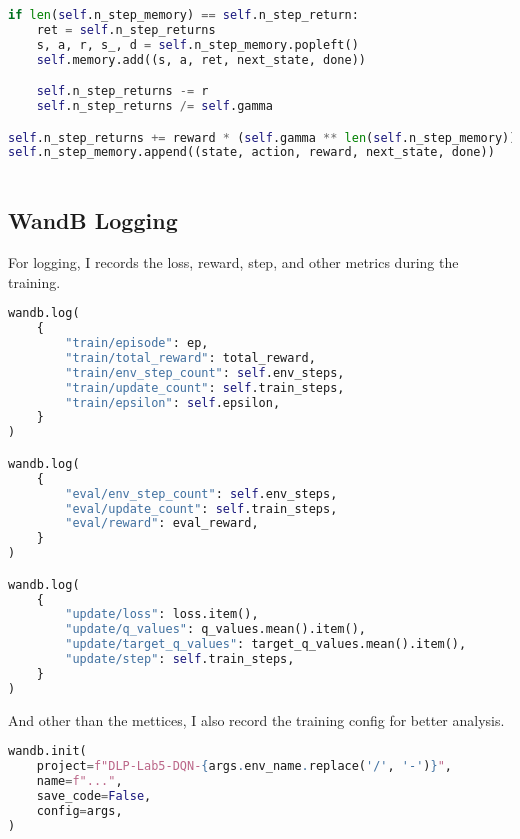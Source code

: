 \begin{lstlisting}[language=Python]
if len(self.n_step_memory) == self.n_step_return:
    ret = self.n_step_returns
    s, a, r, s_, d = self.n_step_memory.popleft()
    self.memory.add((s, a, ret, next_state, done))

    self.n_step_returns -= r
    self.n_step_returns /= self.gamma

self.n_step_returns += reward * (self.gamma ** len(self.n_step_memory))
self.n_step_memory.append((state, action, reward, next_state, done))



\end{lstlisting}

\subsection{WandB Logging}
For logging, I records the loss, reward, step, and other metrics during the training.

\begin{lstlisting}[language=Python]
wandb.log(
    {
        "train/episode": ep,
        "train/total_reward": total_reward,
        "train/env_step_count": self.env_steps,
        "train/update_count": self.train_steps,
        "train/epsilon": self.epsilon,
    }
)

wandb.log(
    {
        "eval/env_step_count": self.env_steps,
        "eval/update_count": self.train_steps,
        "eval/reward": eval_reward,
    }
)

wandb.log(
    {
        "update/loss": loss.item(),
        "update/q_values": q_values.mean().item(),
        "update/target_q_values": target_q_values.mean().item(),
        "update/step": self.train_steps,
    }
)
\end{lstlisting}

And other than the mettices, I also record the training config for better analysis.

\begin{lstlisting}[language=Python]
wandb.init(
    project=f"DLP-Lab5-DQN-{args.env_name.replace('/', '-')}",
    name=f"...",
    save_code=False,
    config=args,
)
\end{lstlisting}